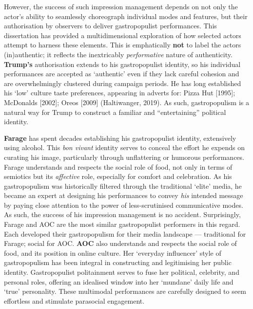 \documentclass[a4paper, nobind]{templates/ociamthesis}
\begin{document}
However, the success of such impression management depends on not only the actor's ability to seamlessly choreograph individual modes and features, but their authorisation by observers to deliver gastropopulist performances. This dissertation has provided a multidimensional exploration of how selected actors attempt to harness these elements. This is emphatically \textbf{not} to label the actors (in)authentic; it reflects the inextricably \emph{performative} nature of authenticity. \textbf{Trump's} authorisation extends to his gastropopulist identity, so his individual performances are accepted as `authentic' even if they lack careful cohesion and are overwhelmingly clustered during campaign periods. He has long established his `low' culture taste preferences, appearing in adverts for: Pizza Hut {[}1995{]}; McDonalds {[}2002{]}; Oreos {[}2009{]} (Haltiwanger, 2019). As such, gastropopulism is a natural way for Trump to construct a familiar and ``entertaining'' political identity.

\textbf{Farage} has spent decades establishing his gastropopulist identity, extensively using alcohol. This \emph{bon vivant} identity serves to conceal the effort he expends on curating his image, particularly through unflattering or humorous performances. Farage understands and respects the social role of food, not only in terms of semiotics but its \emph{affective} role, especially for comfort and celebration. As his gastropopulism was historically filtered through the traditional `elite' media, he became an expert at designing his performances to convey \emph{his} intended message by paying close attention to the power of less-scrutinised communicative modes. As such, the success of his impression management is no accident. Surprisingly, Farage and AOC are the most similar gastropopulist performers in this regard. Each developed their gastropopulism for their media landscape --- traditional for Farage; social for AOC. \textbf{AOC} also understands and respects the social role of food, and its position in online culture. Her `everyday influencer' style of gastropopulism has been integral in constructing and legitimising her public identity. Gastropopulist politainment serves to fuse her political, celebrity, and personal roles, offering an idealised window into her `mundane' daily life and `true' personality. These multimodal performances are carefully designed to seem effortless and stimulate parasocial engagement.
\end{document}
